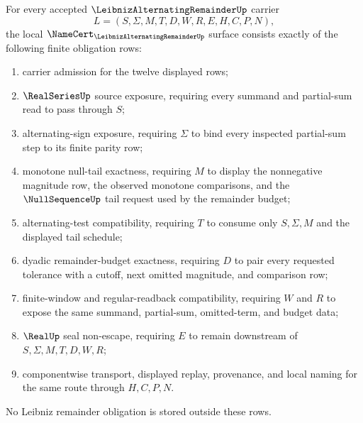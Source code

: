 \begin{theorem}
\label{thm:leibniz-alternating-remainder-namecert-obligations}
For every accepted $\LeibnizAlternatingRemainderUp$ carrier
$$
L=(S,\Sigma,M,T,D,W,R,E,H,C,P,N),
$$
the local $\NameCert_{\LeibnizAlternatingRemainderUp}$ surface consists exactly of the following finite obligation rows:
\begin{enumerate}
\item carrier admission for the twelve displayed rows;
\item $\RealSeriesUp$ source exposure, requiring every summand and partial-sum read to pass through $S$;
\item alternating-sign exposure, requiring $\Sigma$ to bind every inspected partial-sum step to its finite parity row;
\item monotone null-tail exactness, requiring $M$ to display the nonnegative magnitude row, the observed monotone comparisons, and the $\NullSequenceUp$ tail request used by the remainder budget;
\item alternating-test compatibility, requiring $T$ to consume only $S,\Sigma,M$ and the displayed tail schedule;
\item dyadic remainder-budget exactness, requiring $D$ to pair every requested tolerance with a cutoff, next omitted magnitude, and comparison row;
\item finite-window and regular-readback compatibility, requiring $W$ and $R$ to expose the same summand, partial-sum, omitted-term, and budget data;
\item $\RealUp$ seal non-escape, requiring $E$ to remain downstream of $S,\Sigma,M,T,D,W,R$;
\item componentwise transport, displayed replay, provenance, and local naming for the same route through $H,C,P,N$.
\end{enumerate}
No Leibniz remainder obligation is stored outside these rows.
\end{theorem}
